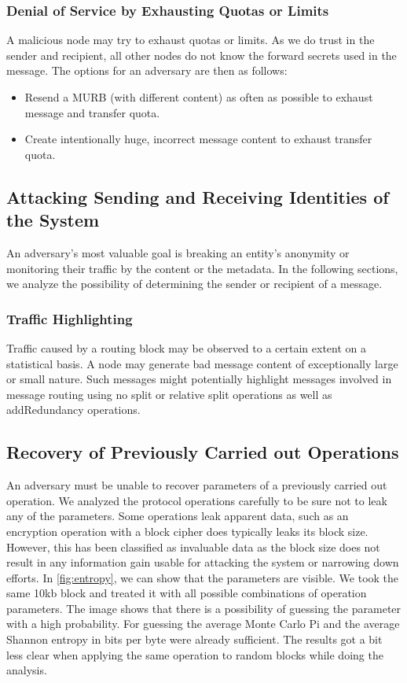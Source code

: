 \subsubsection{Denial of Service by Exhausting Quotas or Limits}
A malicious node may try to exhaust quotas or limits. As we do trust in the sender and recipient, all other nodes do not know the forward secrets used in the message. The options for an adversary are then as follows:

\begin{itemize}
	\item Resend a MURB (with different content) as often as possible to exhaust message and transfer quota. 
	\item Create intentionally huge, incorrect message content to exhaust transfer quota.
\end{itemize}

\subsection{Attacking Sending and Receiving Identities of the \MessageVortex{} System}
An adversary's most valuable goal is breaking an entity's anonymity or monitoring their traffic by the content or the metadata. In the following sections, we analyze the possibility of determining the sender or recipient of a message.


\subsubsection{Traffic Highlighting}
Traffic caused by a routing block may be observed to a certain extent on a statistical basis. A node may generate bad message content of exceptionally large or small nature. Such messages might potentially highlight messages involved in message routing using no split or relative split operations as well as addRedundancy operations.

\subsection{Recovery of Previously Carried out Operations}
An adversary must be unable to recover parameters of a previously carried out operation. We analyzed the protocol operations carefully to be sure not to leak any of the parameters. Some operations leak apparent data, such as an encryption operation with a block cipher does typically leaks its block size. However, this has been classified as invaluable data as the block size does not result in any information gain usable for attacking the system or narrowing down efforts. In \cref{fig:entropy}, we can show that the parameters are visible. We took the same 10kb block and treated it with all possible combinations of operation parameters. The image shows that there is a possibility of guessing the parameter with a high probability. For guessing the average Monte Carlo Pi and the average Shannon entropy in bits per byte were already sufficient. The results got a bit less clear when applying the same operation to random blocks while doing the analysis. 

